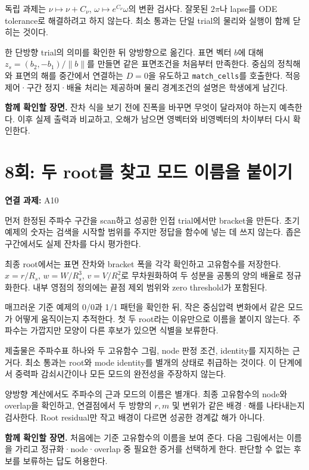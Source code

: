 \documentclass[
  10pt,
  a4paper,
]{article}
\begin{document}
독립 과제는 \(\nu\mapsto\nu+C_\nu\), \(\omega\mapsto e^{C_\nu}\omega\)의
변환 검사다. 잘못된 \(2\pi\)나 lapse를 ODE tolerance로 해결하려고 하지
않는다. 최소 통과는 단일 trial의 물리와 실행이 함께 닫히는 것이다.

한 단방향 trial의 의미를 확인한 뒤 양방향으로 옮긴다. 표면 벡터 \(b\)에
대해 \(z_s=(b_2,-b_1)/\|b\|\)를 만들면 같은 표면조건을 처음부터
만족한다. 중심의 정칙해와 표면의 해를 중간에서 연결하는 \(D=0\)을
유도하고 \texttt{match\_cells}를 호출한다. 적응 제어·구간 정지·배율
처리는 제공하며 물리 경계조건의 설명은 학생에게 남긴다.

\textbf{함께 확인할 장면.} 잔차 식을 보기 전에 진폭을 바꾸면 무엇이
달라져야 하는지 예측한다. 이후 실제 출력과 비교하고, 오해가 남으면
영벡터와 비영벡터의 차이부터 다시 확인한다.

\section{8회: 두 root를 찾고 모드 이름을
붙이기}\label{uxd68c-uxb450-rootuxb97c-uxcc3euxace0-uxbaa8uxb4dc-uxc774uxb984uxc744-uxbd99uxc774uxae30}

\textbf{연결 과제:} A10

먼저 한정된 주파수 구간을 scan하고 성공한 인접 trial에서만 bracket을
만든다. 초기 예제의 숫자는 검색을 시작할 범위를 주지만 정답을 함수에
넣는 데 쓰지 않는다. 좁은 구간에서도 실제 잔차를 다시 평가한다.

최종 root에서는 표면 잔차와 bracket 폭을 각각 확인하고 고유함수를
저장한다. \(x=r/R_s\), \(w=W/R_s^3\), \(v=V/R_s^2\)로 무차원화하여 두
성분을 공통의 양의 배율로 정규화한다. 내부 영점의 정의에는 끝점 제외
범위와 zero threshold가 포함된다.

매끄러운 기준 예제의 0/0과 1/1 패턴을 확인한 뒤, 작은 중심압력 변화에서
같은 모드가 어떻게 움직이는지 추적한다. 첫 두 root라는 이유만으로 이름을
붙이지 않는다. 주파수는 가깝지만 모양이 다른 후보가 있으면 식별을
보류한다.

제출물은 주파수표 하나와 두 고유함수 그림, node 판정 조건, identity를
지지하는 근거다. 최소 통과는 root와 mode identity를 별개의 상태로
취급하는 것이다. 이 단계에서 중력파 감쇠시간이나 모든 모드의 완전성을
주장하지 않는다.

양방향 계산에서도 주파수의 근과 모드의 이름은 별개다. 최종 고유함수의
node와 overlap을 확인하고, 연결점에서 두 방향의 \(r,m\) 및 변위가 같은
배경·해를 나타내는지 검사한다. Root residual만 작고 배경이 다르면 성공한
경계값 해가 아니다.

\textbf{함께 확인할 장면.} 처음에는 기준 고유함수의 이름을 보여 준다.
다음 그림에서는 이름을 가리고 정규화·node·overlap 중 필요한 증거를
선택하게 한다. 판단할 수 없는 후보를 보류하는 답도 허용한다.
\end{document}
